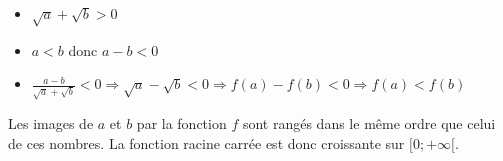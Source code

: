 \begin{pageCours}
\begin{Pv}
\begin{itemize}
\item $\sqrt{a}+\sqrt{b}>0$
\item $a<b$ donc $a-b<0$
\item $\frac{a-b}{\sqrt{a}+\sqrt{b}}<0\Rightarrow \sqrt{a}-\sqrt{b}<0 \Rightarrow f(a)-f(b)<0 \Rightarrow f(a)<f(b)$
\end{itemize}

Les images de $a$ et $b$ par la fonction $f$ sont rangés dans le même ordre que celui de ces nombres. La fonction racine carrée est donc croissante sur $[0;+\infty[$. 
\end{Pv}

\end{pageCours} %


